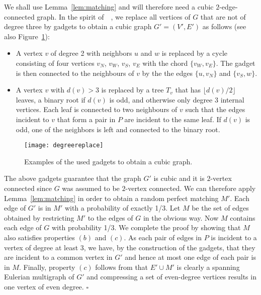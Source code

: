 \documentclass[letterpaper,11pt]{article}
\newenvironment{proof}{\begin{trivlist}
\item[\hskip\labelsep {\bf Proof}.]}{\QED \end{trivlist}}
\newcommand{\QED}{\hfill $\square$}
\begin{document}
\begin{proof}
  We shall use Lemma~\ref{lem:matching} and will therefore need a
  cubic $2$-edge-connected graph. In the spirit of~~\cite{FJJ89}, we replace
  all vertices of $G$ that are not of degree three by gadgets to
  obtain a cubic graph $G'=(V',E')$ as follows (see also
  Figure~\ref{fig:degreplace}):
\begin{itemize}
\item A vertex $v$ of degree 2 with neighbors $u$ and $w$ is replaced
  by a cycle consisting of four vertices $v_N$, $v_W$, $v_S$, $v_E$
  with the chord $\{v_W, v_E\}$. The gadget is then connected to the
  neighbours of $v$ by the the edges $\{u,v_N\}$ and $\{v_S,w\}$.
    
\item A vertex $v$ with $d(v) > 3$ is replaced by a tree $T_v$ that
  has $\lfloor d(v)/2 \rfloor$ leaves, a binary root if $d(v)$ is odd,
  and otherwise only degree $3$ internal vertices. Each leaf is
  connected to two neighbours of $v$ such that the edges incident to $v$
  that form a pair in $P$ are incident to the same leaf.  If $d(v)$ is
  odd, one of the neighbors is left and connected to the binary root.
\end{itemize}

\begin{figure}[bt]
\begin{center}
\texttt{[image: degreereplace]}
\end{center}
\caption{Examples of the used gadgets to obtain a cubic graph.}
\label{fig:degreplace}
\end{figure}
The above gadgets guarantee that the graph $G'$ is cubic and it is
$2$-vertex connected since $G$ was assumed to be $2$-vertex connected.
We can therefore apply Lemma~\ref{lem:matching} in order to obtain
a random perfect matching $M'$. Each edge of $G'$ is in $M'$ with a
probability of exactly 1/3. Let $M$ be the set of edges obtained by
restricting $M'$ to the edges of $G$ in the obvious way. Now $M$
contains each edge of $G$ with probability
1/3.
We complete the proof by showing that $M$ also satisfies properties
$(b)$ and $(c)$.  As each pair of edges in $P$ is incident to a vertex
of degree at least $3$, we have, by the construction of the gadgets,
that they are incident to a common vertex in $G'$ and hence at most
one edge of each pair is in $M$. 
Finally, property $(c)$ follows from that $E' \cup M'$ is clearly a spanning Eulerian
multigraph of $G'$ and compressing a set of even-degree vertices results in one vertex of even degree.
\end{proof}
\end{document}
